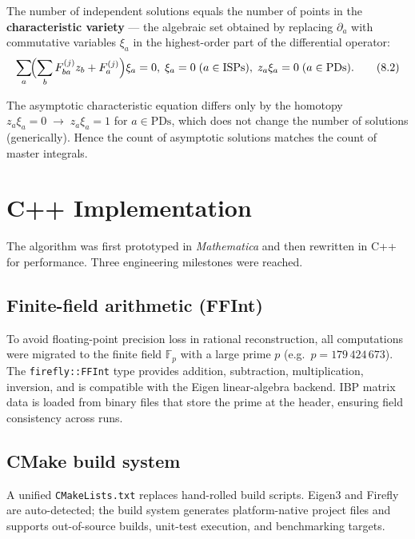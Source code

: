 \documentclass[12pt]{article}
\begin{document}
The number of independent solutions equals the number of points in the
\textbf{characteristic variety} ---
the algebraic set obtained by replacing $\partial_a$ with commutative variables
$\xi_a$ in the highest-order part of the differential operator:
\[
  \sum_a\!\Bigl(\sum_bF_{ba}^{(j)}z_b+F_a^{(j)}\Bigr)\xi_a=0,\;
  \xi_a=0\;(a\in\text{ISPs}),\;
  z_a\xi_a=0\;(a\in\text{PDs}) .
\tag{8.2}\label{eq:char_variety}
\]

The asymptotic characteristic equation differs only by the homotopy
$z_a\xi_a=0\;\to\;z_a\xi_a=1$ for $a\in\text{PDs}$, which does not change the
number of solutions (generically).  Hence the count of asymptotic solutions
matches the count of master integrals.

\section{C++ Implementation}\label{sec:implementation}

The algorithm was first prototyped in \emph{Mathematica} and then rewritten in
C++ for performance.  Three engineering milestones were reached.

\subsection{Finite-field arithmetic (FFInt)}

To avoid floating-point precision loss in rational reconstruction, all
computations were migrated to the finite field $\mathbb F_p$ with a large prime
$p$ (e.g.\ $p=179\,424\,673$).  The \texttt{firefly::FFInt} type provides
addition, subtraction, multiplication, inversion, and is compatible with the
Eigen linear-algebra backend.  IBP matrix data is loaded from binary files that
store the prime at the header, ensuring field consistency across runs.

\subsection{CMake build system}

A unified \texttt{CMakeLists.txt} replaces hand-rolled build scripts.
Eigen3 and Firefly are auto-detected; the build system generates platform-native
project files and supports out-of-source builds, unit-test execution, and
benchmarking targets.
\end{document}
